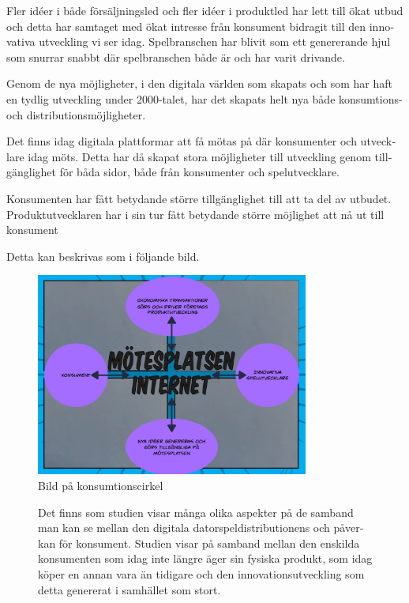\documentclass[11p]{article}
\begin{document}
\begin{otherlanguage}{swedish}
    Fler idéer i både försäljningsled och fler idéer i produktled har lett till ökat utbud och detta har samtaget med ökat intresse från konsument bidragit till den innovativa utveckling vi ser idag. Spelbranschen har blivit som ett genererande hjul som snurrar snabbt där spelbranschen både är och har varit drivande.

    Genom de nya möjligheter, i den digitala världen som skapats och som har haft en tydlig utveckling under 2000-talet, har det skapats helt nya både konsumtions- och distributionsmöjligheter.

    Det finns idag digitala plattformar att få mötas på där konsumenter och utvecklare idag möts. Detta har då skapat stora möjligheter till utveckling genom tillgänglighet för båda sidor, både från konsumenter och spelutvecklare.

    Konsumenten har fått betydande större tillgänglighet till att ta del av  utbudet.
    Produktutvecklaren har i sin tur fått betydande större möjlighet att nå ut till konsument

    Detta kan beskrivas som i följande bild.
    \begin{figure}[!h]

        \center
        \includegraphics[width=0.8\textwidth]{../images/inte_episk_bild}
        \caption{Bild på konsumtionscirkel}

        \label{bild:cirkulär}
    \end{figure}

    \begin{figure}[!h]
    Det finns som studien visar många olika aspekter på de samband man kan se mellan den digitala datorspeldistributionens och påverkan för konsument. Studien visar på samband mellan den enskilda konsumenten som idag inte längre äger sin fysiska produkt, som idag köper en annan vara än tidigare och den innovationsutveckling som detta genererat i samhället som stort.
    \end{figure}
\newpage

\end{otherlanguage}
\end{document}
